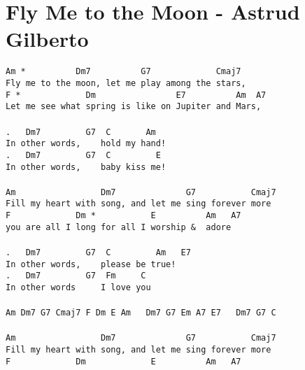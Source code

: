 \newpage
\section{Fly Me to the Moon - Astrud Gilberto}
\label{Fly Me to the Moon - Astrud Gilberto}
\texttt{Am\ *\ \ \ \ \ \ \ \ \ \ Dm7\ \ \ \ \ \ \ \ \ \ G7\ \ \ \ \ \ \ \ \ \ \ \ \ Cmaj7\\
Fly\ me\ to\ the\ moon,\ let\ me\ play\ among\ the\ stars,\\
F\ *\ \ \ \ \ \ \ \ \ \ \ \ \ Dm\ \ \ \ \ \ \ \ \ \ \ \ \ \ \ \ E7\ \ \ \ \ \ \ \ \ \ Am\ \ A7\\
Let\ me\ see\ what\ spring\ is\ like\ on\ Jupiter\ and\ Mars,\\
\\
. \ \ Dm7\ \ \ \ \ \ \ \ \ G7\ \ C\ \ \ \ \ \ \ Am\\
In\ other\ words,\ \ \ \ hold\ my\ hand!\\
. \ \ Dm7\ \ \ \ \ \ \ \ \ G7\ \ C\ \ \ \ \ \ \ \ \ E\\
In\ other\ words,\ \ \ \ baby\ kiss\ me!\\
\\
Am\ \ \ \ \ \ \ \ \ \ \ \ \ \ \ \ \ Dm7\ \ \ \ \ \ \ \ \ \ \ \ \ \ G7\ \ \ \ \ \ \ \ \ \ \ Cmaj7\\
Fill\ my\ heart\ with\ song,\ and\ let\ me\ sing\ forever\ more\\
F\ \ \ \ \ \ \ \ \ \ \ \ \ Dm\ *\ \ \ \ \ \ \ \ \ \ \ E\ \ \ \ \ \ \ \ \ \ Am\ \ \ A7\\
you\ are\ all\ I\ long\ for\ all\ I\ worship\ \& \ adore\\
\\
. \ \ Dm7\ \ \ \ \ \ \ \ \ G7\ \ C\ \ \ \ \ \ \ \ \ Am\ \ \ E7\\
In\ other\ words,\ \ \ \ please\ be\ true!\\
. \ \ Dm7\ \ \ \ \ \ \ \ \ G7\ \ Fm\ \ \ \ \ C\\
In\ other\ words\ \ \ \ \ I\ love\ you\\
\\
Am\ Dm7\ G7\ Cmaj7\ F\ Dm\ E\ Am\ \ \ Dm7\ G7\ Em\ A7\ E7\ \ \ Dm7\ G7\ C\\
\\
Am\ \ \ \ \ \ \ \ \ \ \ \ \ \ \ \ \ Dm7\ \ \ \ \ \ \ \ \ \ \ \ \ \ G7\ \ \ \ \ \ \ \ \ \ \ Cmaj7\\
Fill\ my\ heart\ with\ song,\ and\ let\ me\ sing\ forever\ more\\
F\ \ \ \ \ \ \ \ \ \ \ \ \ Dm\ \ \ \ \ \ \ \ \ \ \ \ \ E\ \ \ \ \ \ \ \ \ \ Am\ \ \ A7\\
}
